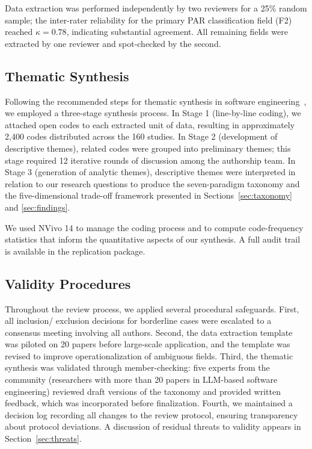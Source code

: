 Data extraction was performed independently by two reviewers for a 25\% random sample; the
inter-rater reliability for the primary PAR classification field (F2) reached $\kappa = 0.78$,
indicating substantial agreement. All remaining fields were extracted by one reviewer and
spot-checked by the second.

\subsection{Thematic Synthesis}
\label{subsec:synthesis}

Following the recommended steps for thematic synthesis in software engineering~\cite{cruzes2011thematic},
we employed a three-stage synthesis process. In Stage 1 (line-by-line coding), we attached
open codes to each extracted unit of data, resulting in approximately 2,400 codes distributed
across the 160 studies. In Stage 2 (development of descriptive themes), related codes were
grouped into preliminary themes; this stage required 12 iterative rounds of discussion among
the authorship team. In Stage 3 (generation of analytic themes), descriptive themes were
interpreted in relation to our research questions to produce the seven-paradigm taxonomy
and the five-dimensional trade-off framework presented in Sections~\ref{sec:taxonomy} and
\ref{sec:findings}.

We used NVivo 14 to manage the coding process and to compute code-frequency statistics that
inform the quantitative aspects of our synthesis. A full audit trail is available in the
replication package.

\subsection{Validity Procedures}

Throughout the review process, we applied several procedural safeguards. First, all inclusion/
exclusion decisions for borderline cases were escalated to a consensus meeting involving all
authors. Second, the data extraction template was piloted on 20 papers before large-scale
application, and the template was revised to improve operationalization of ambiguous fields.
Third, the thematic synthesis was validated through member-checking: five experts from the
community (researchers with more than 20 papers in LLM-based software engineering) reviewed
draft versions of the taxonomy and provided written feedback, which was incorporated before
finalization. Fourth, we maintained a decision log recording all changes to the review
protocol, ensuring transparency about protocol deviations. A discussion of residual threats
to validity appears in Section~\ref{sec:threats}.

